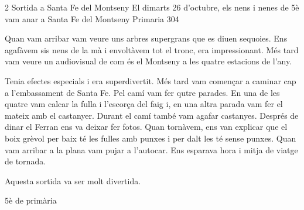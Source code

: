 
\begin{news}
{2} %
{Sortida a Santa Fe del Montseny}
{El dimarts 26 d'octubre,  els nens i nenes de 5è vam anar a Santa Fe del Montseny}
{Primaria}
{304}

\noindent{}


 Quan vam arribar vam veure uns arbres supergrans que es diuen sequoies. Ens agafàvem sis nens de la mà i envoltàvem tot el tronc, era impressionant. Més tard vam veure un audiovisual de com és el Montseny a les quatre estacions de l'any.

 Tenia efectes especials i era superdivertit. Més tard vam començar a caminar cap a l'embassament de Santa Fe. Pel camí vam fer qutre parades. En una de les quatre vam calcar la fulla i l'escorça del faig i, en una altra parada vam fer el mateix amb el castanyer. Durant el camí també  vam agafar castanyes. Després de dinar el Ferran ens va deixar fer fotos. Quan tornàvem,  ens van explicar que el boix grèvol per  baix té les fulles amb punxes i per dalt les té sense punxes. Quan vam arribar a la plana vam pujar a l'autocar. Ens esparava hora i mitja de viatge de tornada.


Aquesta sortida va ser molt divertida.


							{5è de primària}

\end{news}

